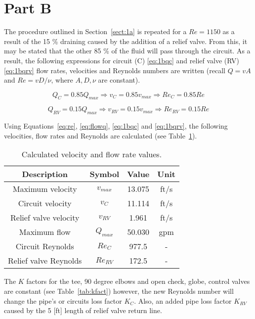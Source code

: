 \section{Part B}
\label{sect:1b}

The procedure outlined in Section~\ref{sect:1a} is repeated for a $Re = 1150$ as a result of the 15 \% draining caused by the addition of a relief valve. From this, it may be stated that the other 85 \% of the fluid will pass through the circuit.  As a result, the following expressions for circuit (C) \ref{eq:1bqc} and relief valve (RV) \ref{eq:1bqrv} flow rates, velocities and Reynolds numbers are written (recall $Q=vA$ and $Re = vD/\nu$, where $A, D, \nu$ are constant).

\begin{equation}
	\label{eq:1bqc}
	Q_C = 0.85 Q_{max} \Rightarrow v_C = 0.85 v_{max} \Rightarrow Re_C = 0.85 Re
\end{equation}

\begin{equation}
	\label{eq:1bqrv}
	Q_{RV} = 0.15 Q_{max} \Rightarrow v_{RV} = 0.15 v_{max} \Rightarrow Re_{RV} = 0.15 Re
\end{equation}

Using Equations~\ref{eq:re}, \ref{eq:flowq}, \ref{eq:1bqc} and \ref{eq:1bqrv}, the following velocities, flow rates and Reynolds are calculated (see Table~\ref{tab:q2flow}).

\begin{table}[H]
  \centering
  \caption{Calculated velocity and flow rate values.}
    \begin{tabular}{cccc}
    \toprule
    \textbf{Description} & \textbf{Symbol} & \textbf{Value } & \textbf{Unit} \\
    \midrule
    Maximum velocity & $v_{max}$ & 13.075 & ft/s \\
    Circuit velocity & $v_C$   & 11.114 &  ft/s  \\
    Relief valve velocity & $v_{RV}$  & 1.961 &  ft/s  \\
	Maximum flow & $Q_{max}$ & 50.030 & gpm \\
	Circuit Reynolds & $Re_{C}$  & 977.5 &  -  \\
	Relief valve Reynolds & $Re_{RV}$  & 172.5 &  -  \\

    \bottomrule
    \end{tabular}
  \label{tab:q2flow}
\end{table}

The $K$ factors for the tee, 90 degree elbows and open check, globe, control valves are constant (see Table~\ref{tab:kfact}) however, the new Reynolds number will change the pipe's or circuits loss factor $K_{C}$. Also, an added pipe loss factor $K_{RV}$ caused by the 5 [ft] length of relief valve return line.\\

